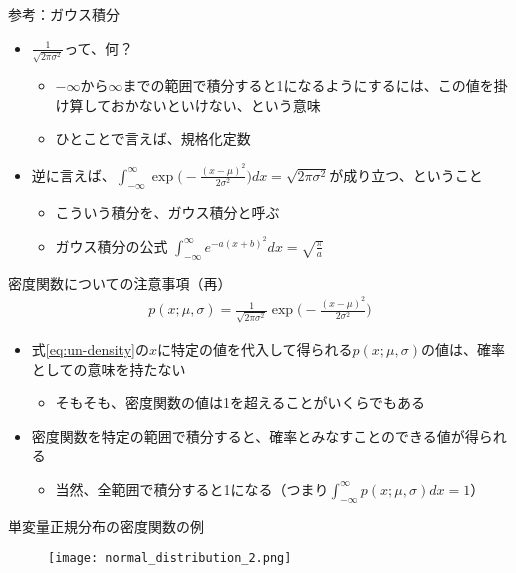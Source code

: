 \documentclass[aspectratio=169,unicode,dvipdfmx,14pt]{beamer}
\begin{document}
\begin{frame}{参考：ガウス積分}
\begin{itemize}
\item $\frac{1}{\sqrt{2\pi\sigma^2}}$って、何？
\begin{itemize}
\item $-\infty$から$\infty$までの範囲で積分すると1になるようにするには、この値を掛け算しておかないといけない、という意味
\item ひとことで言えば、規格化定数
\end{itemize}
\vspace{.1in}
\item 逆に言えば、$\int_{-\infty}^\infty \exp\Big( - \frac{(x - \mu)^2}{2\sigma^2} \Big) dx = \sqrt{2\pi\sigma^2}$が成り立つ、ということ
\begin{itemize}
\item こういう積分を、ガウス積分と呼ぶ
\item ガウス積分の公式 $\int_{-\infty}^\infty e^{-a(x+b)^2}dx = \sqrt{\frac{\pi}{a}}$
\end{itemize}
\end{itemize}
\end{frame}


\begin{frame}{密度関数についての注意事項（再）}
\begin{align}
p(x;\mu,\sigma) = \frac{1}{\sqrt{2\pi\sigma^2}}\exp\Big( - \frac{(x - \mu)^2}{2\sigma^2} \Big)
\label{eq:un-density}
\end{align}
\begin{itemize}
\item 式\eqref{eq:un-density}の$x$に特定の値を代入して得られる$p(x;\mu,\sigma)$の値は、確率としての意味を持たない
\begin{itemize}
\item そもそも、密度関数の値は1を超えることがいくらでもある
\end{itemize}
\item 密度関数を特定の範囲で積分すると、確率とみなすことのできる値が得られる
\begin{itemize}
\item 当然、全範囲で積分すると1になる（つまり$\int_{-\infty}^\infty p(x;\mu,\sigma)dx = 1$）
\end{itemize}
\end{itemize}
\end{frame}

\begin{frame}{単変量正規分布の密度関数の例}
\begin{figure}[b]
\begin{center}
\texttt{[image: normal\_distribution\_2.png]}
\end{center}
\end{figure}
\end{frame}
\end{document}
